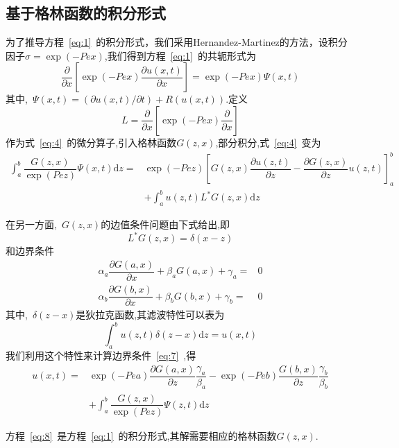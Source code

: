 \documentclass[a4paper,cs4size,adobefonts,cm-default,no-math]{ctexart}
\newcommand{\dif}{\mathrm{d}}
\begin{document}
\subsection{基于格林函数的积分形式}
为了推导方程~\ref{eq:1}~的积分形式，我们采用Hernandez-Martinez的方法，设积分因子$\sigma=\exp(-Pex)$,我们得到方程~\ref{eq:1}~的共轭形式为
\begin{equation}\label{eq:4}
 \dfrac{\partial}{\partial x}\left[\exp(-Pex)\dfrac{\partial u(x,t)}{\partial x}\right]=\exp(-Pex)\Psi(x,t)
\end{equation}
其中,~$\Psi(x,t)=(\partial u(x,t)/\partial t)+R(u(x,t))$.定义
\begin{equation*}
 L=\dfrac{\partial}{\partial x}\left[\exp(-Pex)\dfrac{\partial}{\partial x}\right]
\end{equation*}
作为式~\ref{eq:4}~的微分算子,引入格林函数$G(z,x)$,部分积分,式~\ref{eq:4}~变为
\begin{equation}\label{eq:6}
\begin{split}
  \int_a^b\dfrac{G(z,x)}{\exp(Pez)}\Psi(x,t)\dif z=&\exp(-Pez)\left[G(z,x)\dfrac{\partial u(z,t)}{\partial z}
 -\dfrac{\partial G(z,x)}{\partial z}u(z,t)\right]_a^b\\&+\int_a^b u(z,t)L^*G(z,x)\dif z
\end{split}
\end{equation}\par
在另一方面,~$G(z,x)$的边值条件问题由下式给出,即
\begin{equation}
 L^*G(z,x)=\delta(x-z)
\end{equation}
和边界条件
\begin{equation}\label{eq:7}
 \begin{aligned}
  \alpha_a\dfrac{\partial G(a,x)}{\partial x}+\beta_a G(a,x)+\gamma_a=&0 \\
  \alpha_b\dfrac{\partial G(b,x)}{\partial x}+\beta_b G(b,x)+\gamma_b=&0
 \end{aligned}
\end{equation}
其中,~$\delta(z-x)$是狄拉克函数,其滤波特性可以表为
\begin{equation*}
 \int_a^b u(z,t)\delta(z-x)\dif z=u(x,t)
\end{equation*}
我们利用这个特性来计算边界条件~\ref{eq:7}~,得
\begin{equation}\label{eq:8}
 \begin{split}
  u(x,t)=&\exp(-Pea)\dfrac{\partial G(a,x)}{\partial z}\dfrac{\gamma_a}{\beta_a}-\exp(-Peb)\dfrac{G(b,x)}
  {\partial z}\dfrac{\gamma_b}{\beta_b}\\
  &+\int_a^b\dfrac{G(z,x)}{\exp(Pez)}\Psi(z,t)\dif z
 \end{split}
\end{equation}\par
方程~\ref{eq:8}~是方程~\ref{eq:1}~的积分形式,其解需要相应的格林函数$G(z,x)$.
\end{document}
